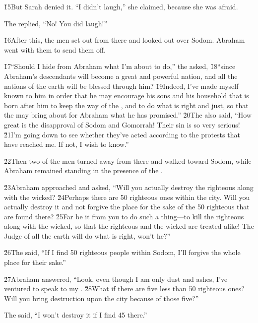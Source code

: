 \v{15}But Sarah denied it. ``I didn't laugh,'' she claimed, because she was afraid.

The  replied, ``No! You did laugh!''

\v{16}After this, the men set out from there and looked out over Sodom. Abraham went with them to send them off.

\v{17}``Should I hide from Abraham what I'm about to do,'' the  asked, \v{18}``since Abraham's descendants will become a great and powerful nation, and all the nations of the earth will be blessed through him? \v{19}Indeed, I've made myself known to him in order that he may encourage his sons and his household that is born after him to keep the way of the , and to do what is right and just, so that the  may bring about for Abraham what he has promised.'' \v{20}The  also said, ``How great is the disapproval of Sodom and Gomorrah! Their sin is so very serious! \v{21}I'm going down to see whether they've acted according to the protests that have reached me. If not, I wish to know.''

\v{22}Then two of the men turned away from there and walked toward Sodom, while Abraham remained standing in the presence of the .

\v{23}Abraham approached and asked, ``Will you actually destroy the righteous along with the wicked? \v{24}Perhaps there are 50 righteous ones within the city. Will you actually destroy it and not forgive the place for the sake of the 50 righteous that are found there? \v{25}Far be it from you to do such a thing---to kill the righteous along with the wicked, so that the righteous and the wicked are treated alike! The Judge of all the earth will do what is right, won't he?''

\v{26}The  said, ``If I find 50 righteous people within Sodom, I'll forgive the whole place for their sake.''

\v{27}Abraham answered, ``Look, even though I am only dust and ashes, I've ventured to speak to my . \v{28}What if there are five less than 50 righteous ones? Will you bring destruction upon the city because of those five?''

The  said, ``I won't destroy it if I find 45 there.''

